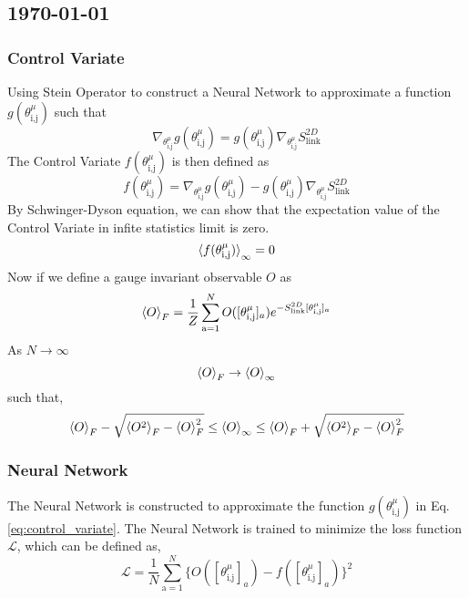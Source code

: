 \begin{center}
\section*{\creationmonth}
\end{center}

\subsection*{\monthdayyeardate\today}

\subsubsection*{Control Variate}
Using Stein Operator to construct a Neural Network to approximate a function $g(\theta^{\mu}_{\text{i,j}})$ such that
\begin{equation}
    \nabla_{\theta^{\mu}_{\text{i,j}}}g(\theta^{\mu}_{\text{i,j}}) = g(\theta^{\mu}_{\text{i,j}})\nabla_{\theta^{\mu}_{\text{i,j}}}S_{\text{link}}^{2D}
    \label{eq:control_variate}
\end{equation}
The Control Variate $f(\theta^{\mu}_{\text{i,j}})$ is then defined as
\begin{equation}
    f(\theta^{\mu}_{\text{i,j}}) =
    \nabla_{\theta^{\mu}_{\text{i,j}}}g(\theta^{\mu}_{\text{i,j}}) - g(\theta^{\mu}_{\text{i,j}})\nabla_{\theta^{\mu}_{\text{i,j}}}S_{\text{link}}^{2D}
\end{equation}
By Schwinger-Dyson equation, we can show that the expectation value of the Control Variate in infite statistics limit is zero.
\begin{equation}
    \braket{f(\theta^{\mu}_{\text{i,j}})}_{\infty} = 0
\end{equation}
Now if we define a gauge invariant observable $O$ as
    \begin{equation}
        \braket{O}_F = \frac{1}{Z}\sum_{\text{a}=1}^{N}O([\theta^{\mu}_{\text{i,j}}]_a)e^{-S_{\text{link}}^{2D}[{\theta^{\mu}_{\text{i,j}}}]_a}
    \end{equation}
As $N\rightarrow\infty$ \begin{equation}
    \braket{O}_F \rightarrow \braket{O}_\infty
\end{equation}
such that,
\begin{equation}
    \braket{O}_F-\sqrt{\braket{O^2}_F - \braket{O}_F^2}\leq \braket{O}_\infty \leq \braket{O}_F+\sqrt{\braket{O^2}_F - \braket{O}_F^2} 
\end{equation}

\subsubsection*{Neural Network}
The Neural Network is constructed to approximate the function $g(\theta^{\mu}_{\text{i,j}})$ in Eq. \ref{eq:control_variate}. The Neural Network is trained to minimize the loss function $\mathcal{L}$, which can be defined as,
\begin{equation}
    \mathcal{L} = \frac{1}{N}\sum_{\text{a}=1}^{N}\{O([\theta^{\mu}_{\text{i,j}}]_a) - f([\theta^{\mu}_{\text{i,j}}]_a)\}^2
\end{equation}